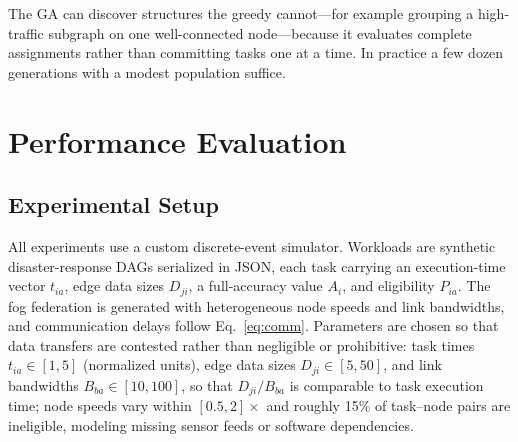 \documentclass[conference]{IEEEtran}
\begin{document}
The GA can discover structures the greedy cannot---for example grouping a high-traffic subgraph on one well-connected node---because it evaluates complete assignments rather than committing tasks one at a time. In practice a few dozen generations with a modest population suffice.

\section{Performance Evaluation}
\label{sec:evaluation}

\subsection{Experimental Setup}

All experiments use a custom discrete-event simulator. Workloads are synthetic disaster-response DAGs serialized in JSON, each task carrying an execution-time vector $t_{ia}$, edge data sizes $D_{ji}$, a full-accuracy value $A_i$, and eligibility $P_{ia}$. The fog federation is generated with heterogeneous node speeds and link bandwidths, and communication delays follow Eq.~\eqref{eq:comm}. Parameters are chosen so that data transfers are contested rather than negligible or prohibitive: task times $t_{ia}\in[1,5]$ (normalized units), edge data sizes $D_{ji}\in[5,50]$, and link bandwidths $B_{ba}\in[10,100]$, so that $D_{ji}/B_{ba}$ is comparable to task execution time; node speeds vary within $[0.5,2]\times$ and roughly 15\% of task--node pairs are ineligible, modeling missing sensor feeds or software dependencies.
\end{document}
